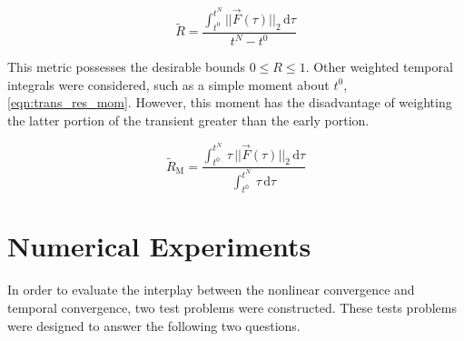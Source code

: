 \begin{equation}
\label{eqn:trans_res_ave}
\tilde{R} = \frac{\int_{t^{0}}^{t^{N}} ||\vec{F}(\tau)||_2 \,\mathrm{d} \tau}{t^{N} - t^{0}}
\end{equation}

This metric possesses the desirable bounds $0 \leq R \leq 1$.
Other weighted temporal integrals were considered, such as a simple moment about $t^{0}$, \eqref{eqn:trans_res_mom}.
However, this moment has the disadvantage of weighting the latter portion of the transient greater than the early portion.

\begin{equation}
\label{eqn:trans_res_mom}
\tilde{R}_{\text{M}} = \frac{\int_{t^{0}}^{t^{N}} \,\tau\,||\vec{F}(\tau)||_2 \,\mathrm{d} \tau}{\int_{t^{0}}^{t^{N}} \,\tau \,\mathrm{d} \tau}
\end{equation}

\section{Numerical Experiments}
\label{sect:numerical_experiments}

In order to evaluate the interplay between the nonlinear convergence and temporal convergence, two test problems were constructed.
These tests problems were designed to answer the following two questions.

